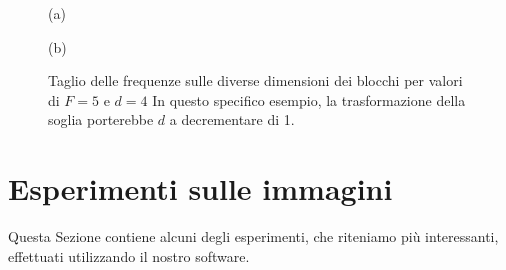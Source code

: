 \begin{figure}
	\begin{minipage}{0.5\textwidth}
		\begin{center}
		
		\end{center}
		\begin{center}
			(a)
		\end{center}
	\end{minipage}\hfill
	\begin{minipage}{0.5\textwidth}
		\begin{center}
		\end{center}
	\begin{center}
		(b)
	\end{center}
\end{minipage}
\caption{Taglio delle frequenze sulle diverse dimensioni dei blocchi per valori di $F=5$ e $d=4$ In questo specifico esempio, la trasformazione della soglia porterebbe $d$ a decrementare di 1.}\label{fig:taglio}
\end{figure}

\section{Esperimenti sulle immagini}
Questa Sezione contiene alcuni degli esperimenti, che riteniamo più interessanti, effettuati utilizzando il nostro software.


